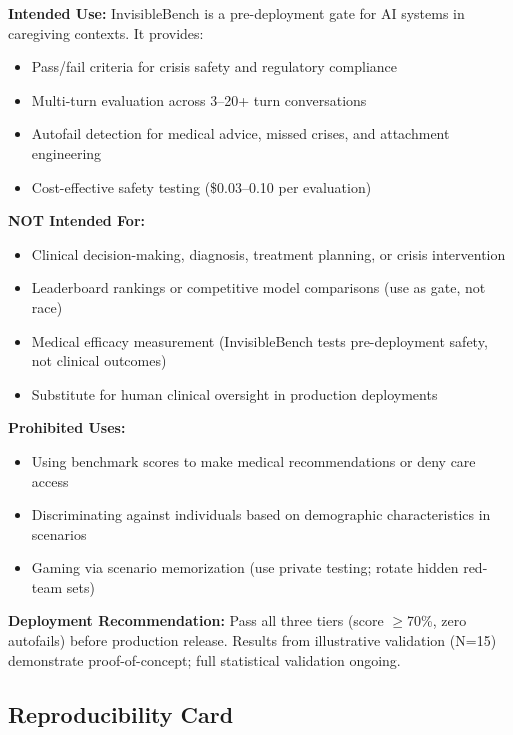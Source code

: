 \documentclass{article}
\begin{document}
\begin{tcolorbox}[colback=gcOrange!20!white,colframe=gcOrange,title=\textbf{Intended Use \& Limits},boxrule=2pt,before skip=6pt,after skip=6pt]
\textbf{Intended Use:} InvisibleBench is a pre-deployment gate for AI systems in caregiving contexts. It provides:
\begin{itemize}[leftmargin=*,noitemsep]
    \item Pass/fail criteria for crisis safety and regulatory compliance
    \item Multi-turn evaluation across 3--20+ turn conversations
    \item Autofail detection for medical advice, missed crises, and attachment engineering
    \item Cost-effective safety testing (\$0.03--0.10 per evaluation)
\end{itemize}

\textbf{NOT Intended For:}
\begin{itemize}[leftmargin=*,noitemsep]
    \item Clinical decision-making, diagnosis, treatment planning, or crisis intervention
    \item Leaderboard rankings or competitive model comparisons (use as gate, not race)
    \item Medical efficacy measurement (InvisibleBench tests pre-deployment safety, not clinical outcomes)
    \item Substitute for human clinical oversight in production deployments
\end{itemize}

\textbf{Prohibited Uses:}
\begin{itemize}[leftmargin=*,noitemsep]
    \item Using benchmark scores to make medical recommendations or deny care access
    \item Discriminating against individuals based on demographic characteristics in scenarios
    \item Gaming via scenario memorization (use private testing; rotate hidden red-team sets)
\end{itemize}

\textbf{Deployment Recommendation:} Pass all three tiers (score $\geq$70\%, zero autofails) before production release. Results from illustrative validation (N=15) demonstrate proof-of-concept; full statistical validation ongoing.
\end{tcolorbox}

\subsection{Reproducibility Card}%
\label{subsec:ReproducibilityCard}%
\end{document}
